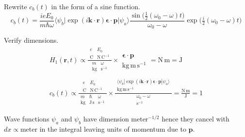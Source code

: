 Rewrite $c_b(t)$ in the form of a sine function.
\begin{equation*}
c_b(t)=\frac{ieE_0}{m\hbar\omega}
\langle\psi_b|\exp(i\mathbf k\cdot\mathbf r)\boldsymbol{\epsilon}\cdot\mathbf p|\psi_a\rangle
\frac{\sin\bigl(\tfrac{1}{2}(\omega_0-\omega)t\bigr)}{\omega_0-\omega}
\exp\bigl(\tfrac{i}{2}(\omega_0-\omega)t\bigr)
\tag{2}
\end{equation*}

Verify dimensions.
\begin{gather*}
H_1(\mathbf r,t)
\propto\frac{
\begin{matrix}
e & E_0
\\
\text{C}
& \text{N}\,\text{C}^{-1}
\end{matrix}
}{
\begin{matrix}
m & \omega
\\
\text{kg} & \text{s}^{-1}
\end{matrix}
}
\times
\begin{matrix}
\\
\boldsymbol{\epsilon}\cdot\mathbf p
\\
\text{kg}\,\text{m}\,\text{s}^{-1}
\end{matrix}
=\text{N}\,\text{m}=\text{J}
\\ %
c_b(t)\propto\frac{
\begin{matrix}
e & E_0
\\
\text{C} & \text{N}\,\text{C}^{-1}
\end{matrix}
}{
\begin{matrix}
m & \hbar & \omega
\\
\text{kg} & \text{J}\,\text{s} & \text{s}^{-1}
\end{matrix}
}
\times
\frac{
\begin{matrix}
\\
\langle\psi_b|\exp(i\mathbf k\cdot\mathbf r)\boldsymbol{\epsilon}\cdot\mathbf p|\psi_a\rangle
\\
\text{kg}\,\text{m}\,\text{s}^{-1}
\end{matrix}
}{
\begin{matrix}
\omega_0-\omega
\\
\text{s}^{-1}
\end{matrix}
}
=\frac{\text{N}\,\text{m}}{\text{J}}=1
\end{gather*}

Wave functions $\psi_a$ and $\psi_b$ have dimension $\text{meter}^{-1/2}$
hence they cancel with $dx\propto\text{meter}$ in the integral leaving
units of momentum due to $\mathbf p$.


